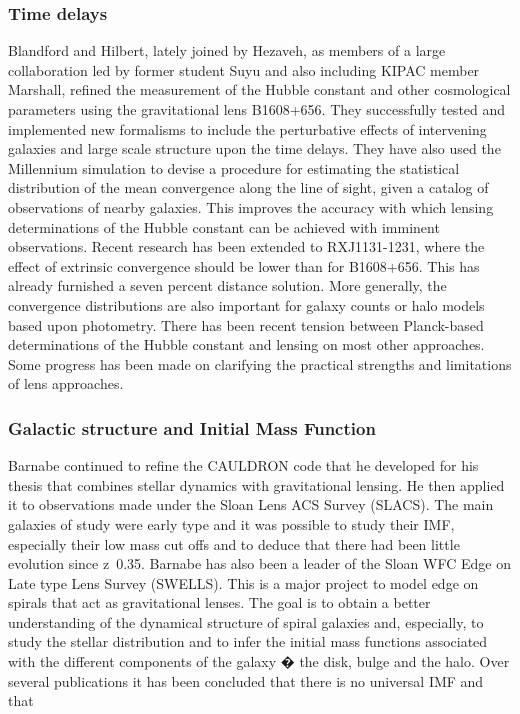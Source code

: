 \documentclass[psfig,11pt]{article}
\begin{document}
{\subsubsection{Time delays}
Blandford and Hilbert, lately joined by Hezaveh, as members of a large collaboration led by former student Suyu and also including KIPAC member Marshall, refined  the measurement of the Hubble constant and other cosmological parameters using the gravitational lens B1608+656. They successfully tested and implemented new formalisms to include the perturbative effects of intervening galaxies and large scale structure upon the time delays.  They have also used the Millennium simulation to devise a procedure for estimating the statistical distribution of the mean convergence along the line of sight, given a catalog of observations of nearby galaxies. This improves the accuracy with which lensing determinations of the Hubble constant can be achieved with imminent observations. Recent research has been extended to RXJ1131-1231, where the effect of extrinsic convergence should be lower than for B1608+656. This has already furnished a seven percent distance solution. More generally, the convergence distributions are also important for galaxy counts or halo models based upon photometry. There has been recent tension between Planck-based determinations of the Hubble constant and lensing on most other approaches. Some progress has been made on clarifying the practical strengths and limitations of lens approaches.
\subsubsection{Galactic structure and Initial Mass Function}
Barnabe continued to refine the CAULDRON code that he developed for his thesis that combines stellar dynamics with gravitational lensing. He then applied it to observations made under the Sloan Lens ACS Survey (SLACS). The main galaxies of study were early type and it was possible to study their IMF, especially their low mass cut offs and to deduce that there had been little evolution since z~0.35. Barnabe has also been a leader of the Sloan WFC Edge on Late type Lens Survey  (SWELLS). This is a major project to model edge on spirals that act as gravitational lenses.  The goal is to obtain a better understanding of the dynamical structure of spiral galaxies and, especially, to study the stellar distribution and to infer the  initial mass functions associated with the different components of the galaxy � the disk, bulge and the halo. Over several publications it has been concluded that there is no universal IMF and that
}
\end{document}
